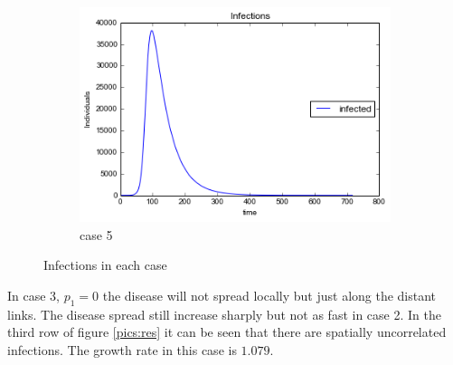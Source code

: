 \begin{figure}[!htb]
    \begin{subfigure}[b]{0.3\textwidth}
        \includegraphics[width=\textwidth]{images/5infections.png} 
        \caption{case 5}
        \label{e}
    \end{subfigure}
    \caption{Infections in each case}\label{fig5.4}
\end{figure}
\newpage

In case 3, $p_1 = 0$ the disease will not spread locally but just along the distant links. The disease spread still increase sharply but not as fast in case 2. In the third row of figure \ref{pics:res} it can be seen that there are spatially uncorrelated infections. The growth rate in this case is $1.079$. 


